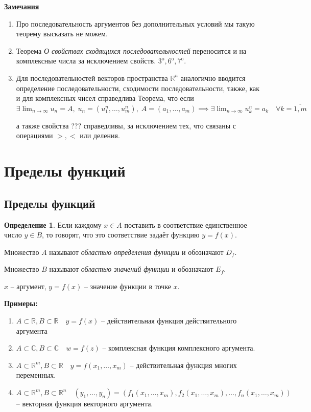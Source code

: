 \documentclass[a4paper,oneside]{article}
\newcommand{\parspace}{\vspace{10pt}}
\newcommand{\dslim}{\displaystyle\lim}
\newcommand{\dslimn}{\dslim_{n \to \infty}}
\newcommand{\prop}[1]{#1^{\text{o}}}
\newcommand{\R}{\mathbb{R}}
\newcommand{\bb}[1]{\mathbb{#1}}
\theoremstyle{definition}
\newtheorem{definition}{Определение}[subsection]
\theoremstyle{definition}
\theoremstyle{definition}
\begin{document}
\underline{\textbf{Замечания}}
\begin{enumerate}
    \item Про последовательность аргументов без дополнительных условий мы такую
    теорему высказать не можем.

    \item Теорема \textit{О свойствах сходящихся последовательностей} переносится
    и на комплексные числа за исключением свойств. $\prop{3}, \prop{6}, \prop{7}$.

    \item Для последовательностей векторов пространства $\mathbb{R}^n$ аналогично
    вводится определение последовательности, сходимости последовательности,
    также, как и для комплексных чисел справедлива Теорема, что если
    $\exists \dslimn u_n = A, \; u_n = (u_1^n, \dots, u_m^n), \;
    A = (a_1, \dots, a_m) \implies \exists \dslimn u_k^n = a_k \quad 
    \forall k = \overline{1, m}$

    а также свойства ??? справедливы, за исключением тех, что связаны
    с операциями $>, <$ или деления.
\end{enumerate}

\section{Пределы функций}

\subsection{Пределы функций}

\begin{definition}
    Если каждому $x \in A$ поставить в соответствие единственное число $y \in B$,
    то говорят, что это соответствие задаёт функцию $y = f(x)$.

    Множество $A$ называют \textit{областью определения функции} и обозначают $D_f$.

    Множество $B$ называют \textit{областью значений функции} и обозначают $E_f$.

    $x$ -- аргумент, $y = f(x)$ -- значение функции в точке $x$.
\end{definition}

\parspace

\textbf{Примеры:}
\begin{enumerate}
    \item $A \subset \R, B \subset \R \quad y = f(x)$ -- действительная
    функция действительного аргумента

    \item $A \subset \bb{C}, B \subset \bb{C} \quad w = f(z)$ -- комплексная
    функция комплексного аргумента.

    \item $A \subset \R^m, B \subset \R \quad y = f(x_1, \dots, x_m)$ --
    действительная функция многих переменных.

    \item $A \subset \R^m, B \subset \R^n \quad 
    (y_1, \dots, y_n) = (f_1(x_1, \dots, x_m), f_2(x_1, \dots, x_m), \dots, f_n(x_1, \dots, x_m))$ --
    векторная функция векторного аргумента.
\end{enumerate}
\end{document}
